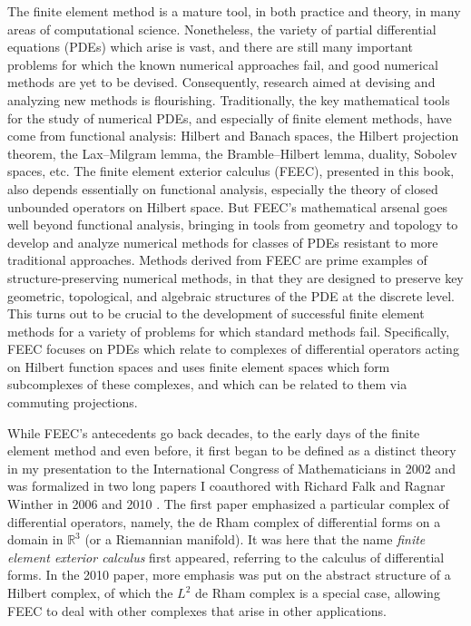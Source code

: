 {The finite element method is a mature tool, in both practice and theory, in many areas of computational science. Nonetheless, the variety of partial differential equations (PDEs) which arise is vast, and there are still many important problems for which the known numerical approaches fail, and good numerical methods are yet to be devised. Consequently, research aimed at devising and analyzing new methods is flourishing. Traditionally, the key mathematical tools for the study of numerical PDEs, and especially of finite element methods, have come from functional analysis: Hilbert and Banach spaces, the Hilbert projection theorem, the Lax–Milgram lemma, the Bramble–Hilbert lemma, duality, Sobolev spaces, etc. The finite element exterior calculus (FEEC), presented in this book, also depends essentially on functional analysis, especially the theory of closed unbounded operators on Hilbert space. But FEEC's mathematical arsenal goes well beyond functional analysis, bringing in tools from geometry and topology to develop and analyze numerical methods for classes of PDEs resistant to more traditional approaches. Methods derived from FEEC are prime examples of structure-preserving numerical methods, in that they are designed to preserve key geometric, topological, and algebraic structures of the PDE at the discrete level. This turns out to be crucial to the development of successful finite element methods for a variety of problems for which standard methods fail. Specifically, FEEC focuses on PDEs which relate to complexes of differential operators acting on Hilbert function spaces and uses finite element spaces which form subcomplexes of these complexes, and which can be related to them via commuting projections.}

{While FEEC's antecedents go back decades, to the early days of the finite element method and even before, it first began to be defined as a distinct theory in my presentation to the International Congress of Mathematicians in 2002  and was formalized in two long papers I coauthored with Richard Falk and Ragnar Winther in 2006  and 2010 . The first paper emphasized a particular complex of differential operators, namely, the de Rham complex of differential forms on a domain in $\mathbb R^3$ (or a Riemannian manifold). It was here that the name \emph{finite element exterior calculus} first appeared, referring to the calculus of differential forms. In the 2010 paper, more emphasis was put on the abstract structure of a Hilbert complex, of which the $L^2$ de Rham complex is a special case, allowing FEEC to deal with other complexes that arise in other applications.}

